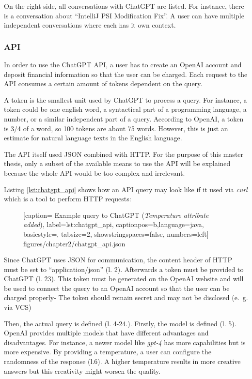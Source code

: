 On the right side, all conversations with ChatGPT are listed. For instance, there is a conversation about \enquote{IntelliJ PSI Modification Fix}. A user can have multiple independent conversations where each has it own context. 

\subsubsection{API}
In order to use the ChatGPT \ac{API}, a user has to create an OpenAI account and deposit financial information so that the user can be charged. Each request to the API consumes a certain amount of tokens dependent on the query. 

A token is the smallest unit used by ChatGPT to process a query. For instance, a token could be one english word, a syntactical part of a programming language, a number, or a similar independent part of a query. According to OpenAI, a token is 3/4 of a word, so 100 tokens are about 75 words. However, this is just an estimate for natural language texts in the English language. 

The \ac{API} itself used JSON combined with \ac{HTTP}. For the purpose of this master thesis, only a subset of the available means to use the \ac{API} will be explained because the whole \ac{API} would be too complex and irrelevant. 

Listing \ref{lst:chatgpt_api} shows how an \ac{API} query may look like if it used via \textit{curl} which is a tool to  perform \ac{HTTP} requests:
 \begin{figure} [htbp!]
			
			[caption={ Example query to ChatGPT  \cite{ChatGPT_url} (\textit{Temperature attribute added})}, 
			label={lst:chatgpt_api},
			captionpos=b,language=java, basicstyle=\footnotesize, tabsize=2, showstringspaces=false,  numbers=left]
			{figures/chapter2/chatgpt_api.json}
		\end{figure}
 

Since ChatGPT uses \ac{JSON} for communication, the content header of \ac{HTTP}  must be set to \enquote{application/json} (l. 2). Afterwards a token must be provided to ChatGPT (l. 23). This  token must be generated on the OpenAI website and will be used to connect the query to an OpenAI account so that the user can be charged properly- The token should remain secret and may not be disclosed (e.~g. via \ac{VCS}) 

Then, the actual query is defined (l. 4-24.). Firstly, the model is defined (l. 5). OpenAI provides multiple models that have different advantages and disadvantages. For instance, a newer model like \textit{gpt-4} has more capabilities but is more expensive.  By providing a temperature, a user can configure the randomness of the response (l.6). A higher temperature results in more creative answers but this creativity might worsen the quality. 

